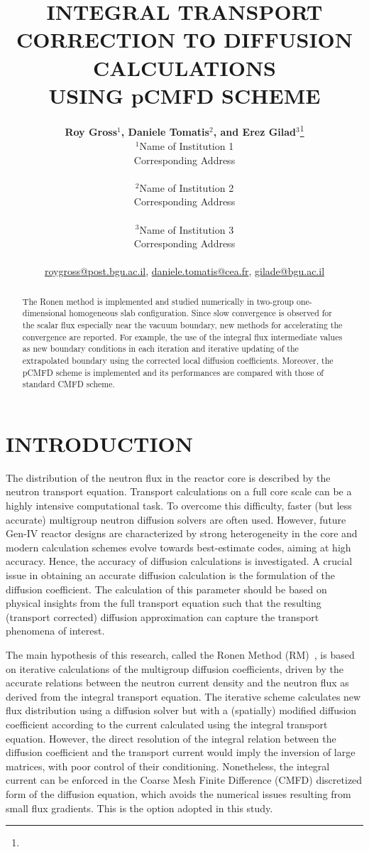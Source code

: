 \documentclass[letterpaper]{physor2020}
\title{INTEGRAL TRANSPORT CORRECTION TO DIFFUSION CALCULATIONS\\USING pCMFD SCHEME}
\author{%
  \textbf{Roy Gross$^1$, Daniele Tomatis$^2$, and Erez Gilad$^3$}\footnote{} \\
  $^1$Name of Institution 1  \\
  Corresponding Address \\ 
\\
  $^2$Name of Institution 2  \\ 
    Corresponding Address \\ 
\\
  $^3$Name of Institution 3  \\
     Corresponding Address \\
     \\
  \url{roygross@post.bgu.ac.il}, \url{daniele.tomatis@cea.fr}, \url{gilade@bgu.ac.il}
}
\begin{document}
\maketitle
\justify 

\begin{abstract}
  The Ronen method is implemented and studied numerically in two-group one-dimensional homogeneous slab configuration. Since slow convergence is observed for the scalar flux especially near the vacuum boundary, new methods for accelerating the convergence are reported. For example, the use of the integral flux intermediate values as new boundary conditions in each iteration and iterative updating of the extrapolated boundary using the corrected local diffusion coefficients. Moreover, the pCMFD scheme is implemented and its performances are compared with those of standard CMFD scheme.
\end{abstract}

\section{INTRODUCTION} 
\label{sec:intro}

The distribution of the neutron flux in the reactor core is described by the neutron transport equation. Transport calculations on a full core scale can be a highly intensive computational task. To overcome this difficulty, faster (but less accurate) multigroup neutron diffusion solvers are often used. However, future Gen-IV reactor designs are characterized by strong heterogeneity in the core and modern calculation schemes evolve towards best-estimate codes, aiming at high accuracy. Hence, the accuracy of diffusion calculations is investigated. A crucial issue in obtaining an accurate diffusion calculation is the formulation of the diffusion coefficient. The calculation of this parameter should be based on physical insights from the full transport equation such that the resulting (transport corrected) diffusion approximation can capture the transport phenomena of interest. 

The main hypothesis of this research, called the Ronen Method (RM)~\cite{Ronen-2004,Tomatis-2011}, is based on iterative calculations of the multigroup diffusion coefficients, driven by the accurate relations between the neutron current density and the neutron flux as derived from the integral transport equation. The iterative scheme calculates new flux distribution using a diffusion solver but with a (spatially) modified diffusion coefficient according to the current calculated using the integral transport equation. However, the direct resolution of the integral relation between the diffusion coefficient and the transport current would imply the inversion of large matrices, with poor control of their conditioning. Nonetheless, the integral current can be enforced in the Coarse Mesh Finite Difference (CMFD) discretized form of the diffusion equation, which avoids the numerical issues resulting from small flux gradients. This is the option adopted in this study. 
\end{document}
